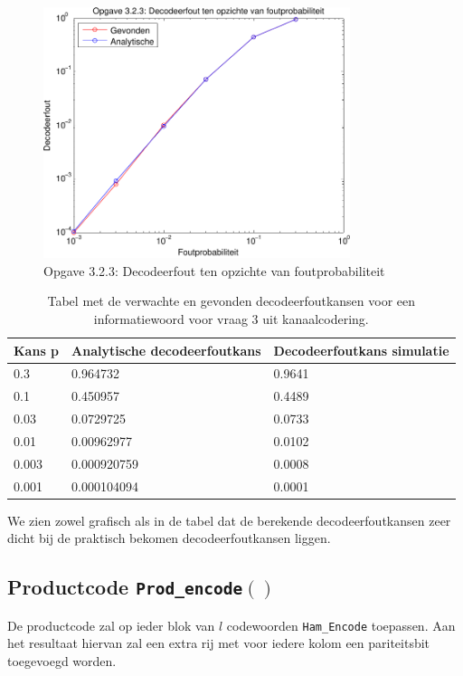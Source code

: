 \documentclass[11pt,a4paper]{article}
\begin{document}
\begin{figure}[h!]
  		\centering
   		\includegraphics[width=0.8\textwidth]{3_2_3_foutprob.pdf}
  		\caption{Opgave 3.2.3: Decodeerfout ten opzichte van foutprobabiliteit}
  		\label{fig:3_2_3_foutprob}
\end{figure}

\begin{table}
\centering
\begin{tabular}{l|l|l}
Kans p & Analytische decodeerfoutkans & Decodeerfoutkans simulatie \\
\hline
0.3		& 0.964732    & 0.9641 \\
0.1		& 0.450957    & 0.4489 \\
0.03	& 0.0729725   & 0.0733 \\
0.01	& 0.00962977  & 0.0102 \\
0.003	& 0.000920759 & 0.0008 \\
0.001	& 0.000104094 & 0.0001 \\
\end{tabular} 
\caption{Tabel met de verwachte en gevonden decodeerfoutkansen voor een informatiewoord voor vraag 3 uit kanaalcodering.}
\label{tab:1.6}
\end{table}

We zien zowel grafisch als in de tabel dat de berekende decodeerfoutkansen zeer dicht bij de praktisch bekomen decodeerfoutkansen liggen.


\subsection{Productcode \texttt{Prod\_encode$\left(\right)$}}

De productcode zal op ieder blok van $l$ codewoorden \texttt{Ham\_Encode} toepassen. Aan het resultaat hiervan zal een extra rij met voor iedere kolom een pariteitsbit toegevoegd worden.\\
\end{document}
